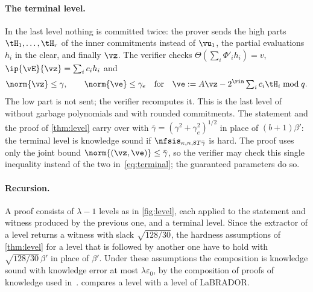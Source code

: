 \paragraph{The terminal level.}
In the last level nothing is committed twice: the prover sends the high parts $\tH_1,\dots,\tH_r$ of the inner commitments instead of $\vu_1$, the partial evaluations $h_i$ in the clear, and finally $\vz$. The verifier checks $\Theta(\sum_i\Phi'_ih_i)=v$, $\ip{\vE}{\vz}=\sum_ic_ih_i$ and
\begin{equation}\label{eq:terminal}
\norm{\vz}\le\gamma,\qquad\norm{\ve}\le\gamma_e\quad\text{for}\quad\ve:=A\vz-2^{\rin}\textstyle\sum_ic_i\tH_i\bmod q .
\end{equation}
The low part is not sent; the verifier recomputes it. This is the last level of~\cite[Section~5.6]{BS23} without garbage polynomials and with rounded commitments. The statement and the proof of \cref{thm:level} carry over with $\bar\gamma=(\gamma^2+\gamma_e^2)^{1/2}$ in place of $(b+1)\beta'$: the terminal level is knowledge sound if $\nfsis_{\kappa,n,8T\bar\gamma}$ is hard. The proof uses only the joint bound $\norm{(\vz,\ve)}\le\bar\gamma$, so the verifier may check this single inequality instead of the two in~\eqref{eq:terminal}; the guaranteed parameters do so.

\paragraph{Recursion.}
A proof consists of $\lambda-1$ levels as in \cref{fig:level}, each applied to the statement and witness produced by the previous one, and a terminal level. Since the extractor of a level returns a witness with slack $\sqrt{128/30}$, the hardness assumptions of \cref{thm:level} for a level that is followed by another one have to hold with $\sqrt{128/30}\,\beta'$ in place of $\beta'$. Under these assumptions the composition is knowledge sound with knowledge error at most $\lambda\varepsilon_0$, by the composition of proofs of knowledge used in~\cite{BS23}.  compares a level with a level of LaBRADOR.

